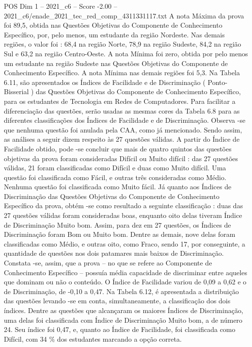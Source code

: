 \begin{textsample}{POS Dim 1 – 2021\_c6 – Score -2.00 – 2021\_c6/enade\_2021\_tec\_red\_comp\_4311331117.txt}
A nota Máxima da prova foi 89,5, obtida nas Questões Objetivas do Componente de Conhecimento Específico, por, pelo menos, um estudante da região Nordeste.
Nas demais regiões, o valor foi : 68,4 na região Norte, 78,9 na região Sudeste, 84,2 na região Sul e 63,2 na região Centro-Oeste.
A nota Mínima foi zero, obtida por pelo menos um estudante na região Sudeste nas Questões Objetivas do Componente de Conhecimento Específico.
A nota Mínima nas demais regiões foi 5,3.
Na Tabela 6.11, são apresentados os Índices de Facilidade e de Discriminação ( Ponto-Bisserial ) das Questões Objetivas do Componente de Conhecimento Específico, para os estudantes de Tecnologia em Redes de Computadores.
Para facilitar a diferenciação das questões, serão usadas as mesmas cores da Tabela 6.8 para as diferentes classificações dos Índices de Facilidade e de Discriminação.
Observa -se que nenhuma questão foi anulada pela CAA, como já mencionado.
Sendo assim, as análises a seguir dizem respeito às 27 questões válidas.
A partir do Índice de Facilidade obtido, pode -se concluir que mais de quatro quintos das questões objetivas da prova foram consideradas Difícil ou Muito difícil : das 27 questões válidas, 21 foram classificadas como Difícil e duas como Muito difícil.
Uma questão foi classificada como Fácil, e outras três consideradas como Médio.
Nenhuma questão foi classificada como Muito fácil.
Já quanto aos Índices de Discriminação das Questões Objetivas do Componente de Conhecimento Específico da prova, obtém -se como resultado a seguinte classificação : duas das 27 questões válidas foram consideradas boas, enquanto oito delas tiveram Índice de Discriminação Muito bom.
Assim, para dez em 27 questões, os Índices de Discriminação foram Bom ou Muito bom.
Dentre as demais, nove delas foram classificadas como Médio, e outras oito, como Fraco, sendo 17, por conseguinte, a quantidade de questões nos dois patamares mais baixos de Discriminação.
Constata -se, assim, que a prova – no que se refere ao Componente de Conhecimento Específico – possuía média capacidade de discriminar entre aqueles que dominam ou não o conteúdo.
O Índice de Facilidade variou de 0,09 a 0,62 e o de Discriminação, de -0,10 a 0,47.
Na Tabela 6.12, é apresentada a distribuição das questões levando -se em conta, simultaneamente, a classificação dos dois índices.
Dentre as questões que alcançaram os maiores Índices de Discriminação, uma delas foi classificada com Índice de Discriminação Muito bom, a de número 24.
Seu índice foi 0,47, e, quanto ao Índice de Facilidade, foi classificada como Difícil, com 34 \% dos estudantes marcando a opção correta.

\end{textsample}
